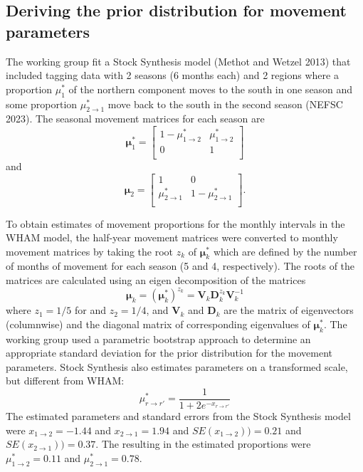 \documentclass[
]{article}
\begin{document}
\hypertarget{deriving-the-prior-distribution-for-movement-parameters}{%
\subsection*{Deriving the prior distribution for movement
parameters}\label{deriving-the-prior-distribution-for-movement-parameters}}

The working group fit a Stock Synthesis model (Methot and Wetzel 2013)
that included tagging data with 2 seasons (6 months each) and 2 regions
where a proportion \(\mu^*_1\) of the northern component moves to the
south in one season and some proportion \(\mu^*_{2\rightarrow 1}\) move
back to the south in the second season (NEFSC 2023). The seasonal
movement matrices for each season are \begin{equation*}
\boldsymbol{\mu}^*_{1} = 
  \begin{bmatrix}
     1-\mu^*_{1\rightarrow 2} & \mu^*_{1\rightarrow 2} \\
     0 & 1 \\
  \end{bmatrix}
\end{equation*} and \begin{equation*}
\boldsymbol{\mu}_{2} = 
  \begin{bmatrix}
     1 &  0 \\
     \mu^*_{2\rightarrow 1} & 1-\mu^*_{2\rightarrow 1} \\
  \end{bmatrix}.
\end{equation*}

To obtain estimates of movement proportions for the monthly intervals in
the WHAM model, the half-year movement matrices were converted to
monthly movement matrices by taking the root \(z_k\) of
\(\boldsymbol{\mu}^*_{k}\) which are defined by the number of months of
movement for each season (5 and 4, respectively). The roots of the
matrices are calculated using an eigen decomposition of the matrices
\[ \boldsymbol{\mu}_k =  \left(\boldsymbol{\mu}_k^*\right)^{z_k} = \mathbf{V}_k \mathbf{D}_k^{z_k} \mathbf{V}_k^{-1}\]
where \(z_1 = 1/5\) for and \(z_2 = 1/4\), and \(\mathbf{V}_{k}\) and
\(\mathbf{D}_{k}\) are the matrix of eigenvectors (columnwise) and the
diagonal matrix of corresponding eigenvalues of
\(\boldsymbol{\mu}^*_k\). The working group used a parametric bootstrap
approach to determine an appropriate standard deviation for the prior
distribution for the movement parameters. Stock Synthesis also estimates
parameters on a transformed scale, but different from WHAM:
\[\mu^*_{r\rightarrow r'} = \frac{1}{1 + 2e^{-x_{r\rightarrow r'}}}\]
The estimated parameters and standard errors from the Stock Synthesis
model were \(x_{1\rightarrow 2}=-1.44\) and \(x_{2\rightarrow 1}=1.94\)
and \(SE(x_{1\rightarrow 2})) = 0.21\) and
\(SE(x_{2\rightarrow 1})) = 0.37\). The resulting in the estimated
proportions were \(\mu^*_{1\rightarrow 2}=0.11\) and
\(\mu^*_{2\rightarrow 1}=0.78\).
\end{document}
